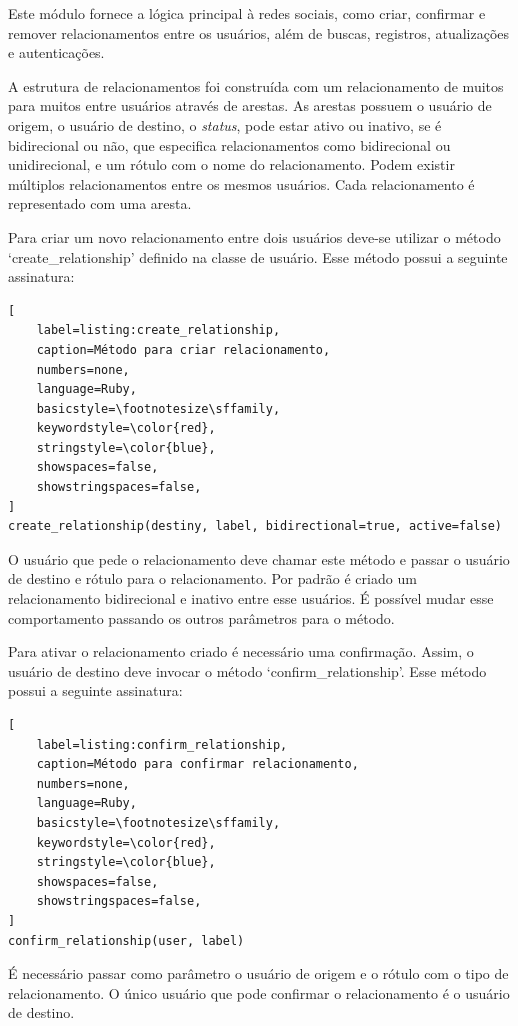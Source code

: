 Este módulo fornece a lógica principal à redes sociais, como criar, confirmar e remover relacionamentos entre os usuários, além de buscas, registros, atualizações e autenticações.

A estrutura de relacionamentos foi construída com um relacionamento de muitos para muitos entre usuários através de arestas. As arestas possuem o usuário de origem, o usuário de destino, o \textit{status}, pode estar ativo ou inativo, se é bidirecional ou não, que  especifica relacionamentos como bidirecional ou unidirecional, e um rótulo com o nome do relacionamento. Podem existir múltiplos relacionamentos entre os mesmos usuários. Cada relacionamento é representado com uma aresta.

Para criar um novo relacionamento entre dois usuários deve-se utilizar o método `create\_relationship' definido na classe de usuário. Esse método possui a seguinte assinatura:

\begin{lstlisting}[
    label=listing:create_relationship,
    caption=Método para criar relacionamento,
    numbers=none,
    language=Ruby,
    basicstyle=\footnotesize\sffamily,
    keywordstyle=\color{red},
    stringstyle=\color{blue},
    showspaces=false,
    showstringspaces=false,
]
create_relationship(destiny, label, bidirectional=true, active=false)
\end{lstlisting}

O usuário que pede o relacionamento deve chamar este método e passar o usuário de destino e rótulo para o relacionamento. Por padrão é criado um relacionamento bidirecional e inativo entre esse usuários. É possível mudar esse comportamento passando os outros parâmetros para o método.

Para ativar o relacionamento criado é necessário uma confirmação. Assim, o usuário de destino deve invocar o método `confirm\_relationship'. Esse método possui a seguinte assinatura:

\begin{lstlisting}[
    label=listing:confirm_relationship,
    caption=Método para confirmar relacionamento,
    numbers=none,
    language=Ruby,
    basicstyle=\footnotesize\sffamily,
    keywordstyle=\color{red},
    stringstyle=\color{blue},
    showspaces=false,
    showstringspaces=false,
]
confirm_relationship(user, label)
\end{lstlisting}

É necessário passar como parâmetro o usuário de origem e o rótulo com o tipo de relacionamento. O único usuário que pode confirmar o relacionamento é o usuário de destino.

